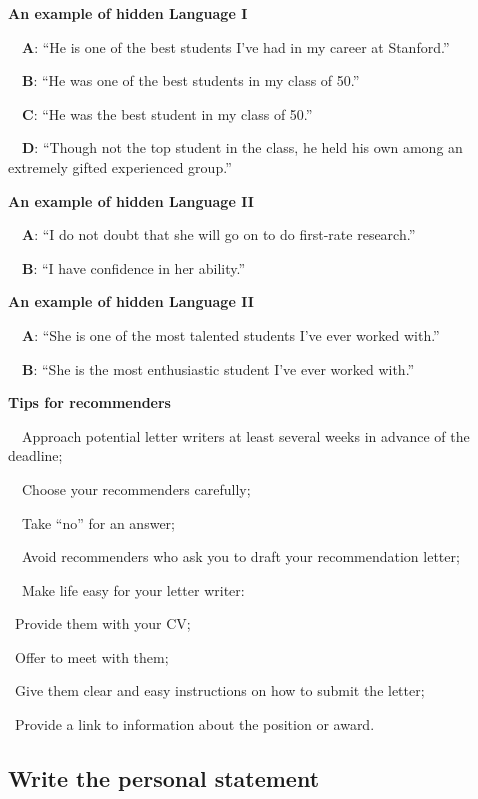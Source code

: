 \documentclass[a4paper, 12pt]{article}
\begin{document}
\textbf{An example of hidden Language I}
\par\ \textbullet\ \textbf{A}: ``He is one of the best students I've had in my career at Stanford.''
\par\ \textbullet\ \textbf{B}: ``He was one of the best students in my class of 50.''
\par\ \textbullet\ \textbf{C}: ``He was the best student in my class of 50.''
\par\ \textbullet\ \textbf{D}: ``Though not the top student in the class, he held his own among an extremely gifted experienced group.''

\textbf{An example of hidden Language II}
\par\ \textbullet\ \textbf{A}: ``I do not doubt that she will go on to do first-rate research.''
\par\ \textbullet\ \textbf{B}: ``I have confidence in her ability.''

\textbf{An example of hidden Language II}
\par\ \textbullet\ \textbf{A}: ``She is one of the most talented students I've ever worked with.''
\par\ \textbullet\ \textbf{B}: ``She is the most enthusiastic student I've ever worked with.''

\newpage\textbf{Tips for recommenders}
\par\ \textbullet\ Approach potential letter writers at least several weeks in advance of the deadline;
\par\ \textbullet\ Choose your recommenders carefully;
\par\ \textbullet\ Take ``no'' for an answer;
\par\ \textbullet\ Avoid recommenders who ask you to draft your recommendation letter;
\par\ \textbullet\ Make life easy for your letter writer:
\par\quad\textopenbullet\ Provide them with your CV;
\par\quad\textopenbullet\ Offer to meet with them;
\par\quad\textopenbullet\ Give them clear and easy instructions on how to submit the letter;
\par\quad\textopenbullet\ Provide a link to information about the position or award.

\newpage\subsection{Write the personal statement}
\end{document}
